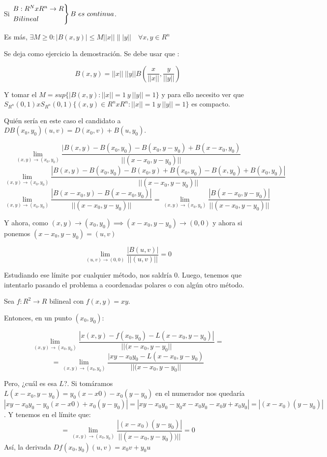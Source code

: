 \begin{nprop}
	Si $\begin{rcases}
	B: R^N x R^n \to R\\
	Bilineal
\end{rcases} B \ es \ continua$.

Es más, $\exists M \geq 0 : |B(x,y)| \leq M||x||\||y|| \quad \forall x,y \in R^n$

	Se deja como ejercicio la demostración. Se debe usar que :

	\[
	B(x,y) = ||x||\ ||y|| B(\frac{x}{||x||},\frac{y}{||y||})
	\]

	Y tomar el $M = sup\{|B(x,y): ||x|| = 1 \ y \ ||y|| = 1\}$ y para ello necesito ver que $S_{R^n}(0,1)xS_{R^n}(0,1)\{(x,y) \in R^nxR^n : ||x|| = 1 \ y \ ||y|| = 1\}$ es compacto.

	Quién sería en este caso el candidato a $DB(x_0,y_0)(u,v) = D(x_0,v)+B(u,y_0)$.

\[
\lim_{(x,y) \to (x_0,y_0)}\frac{|B(x,y) - B(x_0,y_0) - B(x_0,y-y_0) + B(x-x_0,y_0)}{||(x-x_0,y-y_0)||}
\]
\[
\lim_{(x,y) \to (x_0,y_0)}\frac{|B(x,y) - B(x_0,y_0) - B(x_0,y) + B(x_0,y_0) - B(x,y_0) + B(x_0,y_0)|}{||(x-x_0,y-y_0)||}
\]
\[
\lim_{(x,y) \to (x_0,y_0)}\frac{|B(x-x_0,y)- B(x-x_0,y_0)|}{||(x-x_0,y-y_0)||} = \lim_{(x,y) \to (x_0,y_0)}\frac{|B(x-x_0,y-y_0)|}{||(x-x_0,y-y_0)||}
\]

Y ahora, como $(x,y) \to (x_0,y_0) \implies (x-x_0,y-y_0) \to (0,0)$ y ahora si ponemos $(x-x_0,y-y_0) = (u,v)$

\[
 \lim_{(u,v) \to (0,0)}\frac{|B(u,v)|}{||(u,v)||} = 0
\]

Estudiando ese límite por cualquier método, nos saldría 0. Luego, tenemos que intentarlo pasando el problema a coordenadas polares o con algún otro método.
\end{nprop}

\begin{ejemplo}
	Sea $f:R^2 \to R$ bilineal con $f(x,y) = xy$.

	Entonces, en un punto $(x_0,y_0)$:

	\[
	\lim_{(x,y) \to (x_0, y_0)} \frac{|x(x,y) - f(x_0,y_0) - L(x-x_0, y-y_0)|}{||(x-x_0,y-y_0||} =
	\]
	\[
	 =  \lim_{(x,y) \to (x_0,y_0)} \frac{|xy-x_0y_0 - L(x-x_0,y-y_0)}{||(x-x_0,y-y_0||}
	\]

	Pero, ¿cuál es esa $L$?. Si tomáramos $L(x-x_0,y-y_0) = y_0(x-x0) - x_0(y-y_0)$ en el numerador nos quedaría $|xy - x_0y_0 - y_0(x-x0) + x_0(y-y_0)| = |xy- x_0y_0 -y_0x -x_0y_0 - x_0y+x_0y_0 |= | (x-x_0)(y-y_0)|$. Y tenemos en el límite que:
	\[
	 = \lim_{(x,y) \to (x_0,y_0)} \frac{|(x-x_0)(y-y_0)|}{||(x-x_0,y-y_0))||} = 0
	\]
	Así, la derivada $Df(x_0,y_0)(u,v) = x_0v + y_0 u$
\end{ejemplo}

